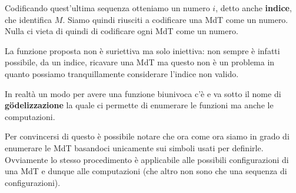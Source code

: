 Codificando quest'ultima sequenza otteniamo un numero $i$,
detto anche \textbf{indice}, che identifica $M$. Siamo quindi
riusciti a codificare una MdT come un numero. Nulla ci vieta
di quindi di codificare ogni MdT come un numero.

La funzione proposta non è suriettiva ma solo iniettiva: non
sempre è infatti possibile, da un indice, ricavare una MdT
ma questo non è un problema in quanto possiamo tranquillamente
considerare l'indice non valido.

In realtà un modo per avere una funzione biunivoca c'è e va
sotto il nome di \textbf{g\"odelizzazione} la quale ci permette
di enumerare le funzioni ma anche le computazioni.

Per convincersi di questo è possibile notare che ora come ora
siamo in grado di enumerare le MdT basandoci unicamente sui
simboli usati per definirle. Ovviamente lo stesso procedimento
è applicabile alle possibili configurazioni di una MdT e dunque
alle computazioni (che altro non sono che una sequenza di
configurazioni).
